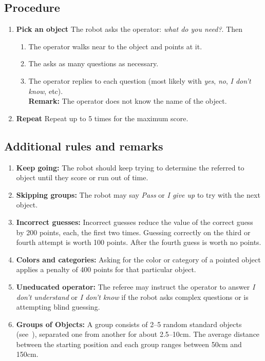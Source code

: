 \subsection*{Procedure}
\begin{enumerate}[nosep]
	\item \textbf{Pick an object} The robot asks the operator: \emph{what do you need?}. %
	Then
	\begin{enumerate}[nosep]
		\item The operator walks near to the object and points at it.
		\item The asks as many questions as necessary.
		\item The operator replies to each question (most likely with \emph{yes}, \emph{no}, \emph{I don't know}, etc).
		\\\textbf{Remark:} The operator does not know the name of the object.
	\end{enumerate}
  \item \textbf{Repeat} Repeat up to 5 times for the maximum score.
\end{enumerate}


%
%
\subsection*{Additional rules and remarks}
\begin{enumerate}[nosep]
	\item \textbf{Keep going:} The robot should keep trying to determine the referred to object until they score or run out of time.

	\item \textbf{Skipping groups:} The robot may say \emph{Pass} or \emph{I give up} to try with the next object.

	\item \textbf{Incorrect guesses:} Incorrect guesses reduce the value of the correct guess by 200 points, each, the first two times. Guessing correctly on the third or fourth attempt is worth 100 points. After the fourth guess is worth no points.

	\item\textbf{Colors and categories:} Asking for the color or category of a pointed object applies a penalty of 400 points for that particular object.

	\item\textbf{Uneducated operator:} The referee may instruct the operator to answer \emph{I don't understand} or \emph{I don't know} if the robot asks complex questions or is attempting blind guessing.

	\item \textbf{Groups of Objects:} A group consists of 2--5 random standard objects (see~), separated one from another for about 2.5--10cm.
	The average distance between the starting position and each group ranges between 50cm and 150cm.

\end{enumerate}

